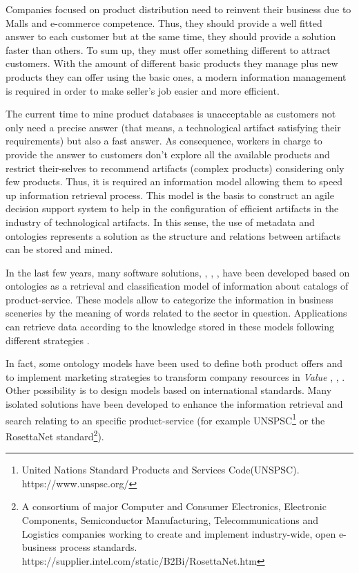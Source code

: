\documentclass[runningheads,a4paper]{llncs}
\begin{document}
Companies focused on product distribution need to reinvent their business due to Malls and e-commerce competence. Thus, they should provide a well fitted answer to each customer but at the same time, they should provide a solution faster than others. To sum up, they must offer something different to attract customers. With the amount of different basic products they manage plus new products they can offer using the basic ones, a modern information management is required in order to make seller's job easier and more efficient. 

The current time to mine product databases is unacceptable as customers not only need a precise answer (that means, a technological artifact satisfying their requirements) but also a fast answer. As consequence, workers in charge to provide the answer to customers don't explore all the available products and restrict their-selves to recommend artifacts (complex products) considering only few products. Thus, it is required an information model allowing them to speed up information retrieval process. This model is the basis to construct an agile decision support system to help in the configuration of efficient artifacts in the industry of technological artifacts. In this sense, the use of metadata and ontologies represents a solution \cite{berners2001semantic} as the structure and relations between artifacts can be stored and mined.

In the last few years, many software solutions\cite{hepp2006products}, \cite{hepp2008goodrelations}, \cite{stolz2014pcs2owl}, \cite{vegetti2011pronto}, \cite{Reyes-Alvarez:2016} have been developed based on ontologies as a retrieval and classification model of information about catalogs of product-service. These models allow to categorize the information in business sceneries by the meaning of words related to the sector in question. Applications can retrieve data according to the knowledge stored in these models following different strategies \cite{Reyes-Alvarez:2016}.

In fact, some ontology models have been used to define both product offers and to implement marketing strategies to transform company resources in \textit{Value} \cite{andersson2006towards}, \cite{pigneur2002ontology}, \cite{rese2013ontology}. 
Other possibility is to design models based on international standards. Many isolated solutions have been developed to enhance the information retrieval and search relating to an specific product-service (for example UNSPSC\footnote{United Nations Standard Products and Services Code(UNSPSC). https://www.unspsc.org/} or the RosettaNet standard\footnote{A consortium of major Computer and Consumer Electronics, Electronic Components, Semiconductor Manufacturing, Telecommunications and Logistics companies working to create and implement industry-wide, open e-business process standards. https://supplier.intel.com/static/B2Bi/RosettaNet.htm}). 
\end{document}
